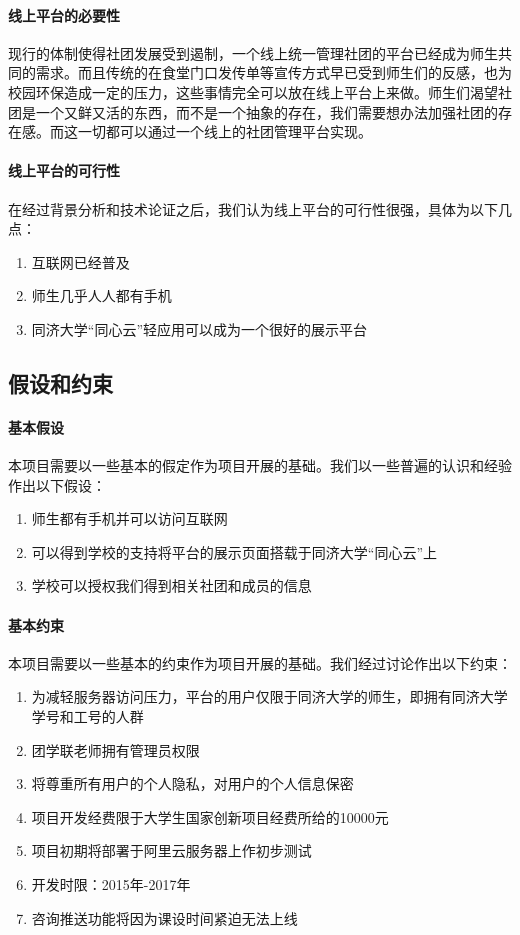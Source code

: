 \documentclass[UTF8]{ctexart}
\begin{document}
\paragraph{线上平台的必要性}
现行的体制使得社团发展受到遏制，一个线上统一管理社团的平台已经成为师生共同的需求。而且传统的在食堂门口发传单等宣传方式早已受到师生们的反感，也为校园环保造成一定的压力，这些事情完全可以放在线上平台上来做。师生们渴望社团是一个又鲜又活的东西，而不是一个抽象的存在，我们需要想办法加强社团的存在感。而这一切都可以通过一个线上的社团管理平台实现。

\paragraph{线上平台的可行性}
在经过背景分析和技术论证之后，我们认为线上平台的可行性很强，具体为以下几点：

\begin{enumerate}[1)]
\item 互联网已经普及
\item 师生几乎人人都有手机
\item 同济大学“同心云”轻应用可以成为一个很好的展示平台
\end{enumerate}

\subsection{假设和约束}
\paragraph{基本假设}本项目需要以一些基本的假定作为项目开展的基础。我们以一些普遍的认识和经验作出以下假设：

\begin{enumerate}[1)]
\item 师生都有手机并可以访问互联网
\item 可以得到学校的支持将平台的展示页面搭载于同济大学“同心云”上
\item 学校可以授权我们得到相关社团和成员的信息
\end{enumerate}

\paragraph{基本约束}
本项目需要以一些基本的约束作为项目开展的基础。我们经过讨论作出以下约束：

\begin{enumerate}[1)]
\item 为减轻服务器访问压力，平台的用户仅限于同济大学的师生，即拥有同济大学学号和工号的人群
\item 团学联老师拥有管理员权限
\item 将尊重所有用户的个人隐私，对用户的个人信息保密
\item 项目开发经费限于大学生国家创新项目经费所给的10000元
\item 项目初期将部署于阿里云服务器上作初步测试
\item 开发时限：2015年-2017年
\item 咨询推送功能将因为课设时间紧迫无法上线
\end{enumerate}
\end{document}
